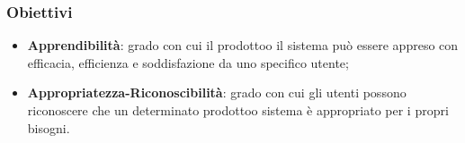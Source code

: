         \subsubsection{Obiettivi}
            \begin{itemize}
                \item \textbf{Apprendibilità}: grado con cui il prodotto\glosp o il sistema può essere appreso con efficacia, efficienza e soddisfazione da uno specifico utente;
                \item \textbf{Appropriatezza-Riconoscibilità}: grado con cui gli utenti possono riconoscere che un determinato prodotto\glosp o sistema è appropriato per i propri bisogni.
            \end{itemize}
